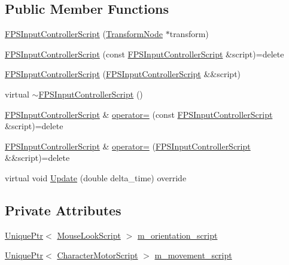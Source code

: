 \subsection*{Public Member Functions}
\begin{DoxyCompactItemize}
\item 
\hyperlink{classmage_1_1_f_p_s_input_controller_script_afb654c7011472ef300658503efaf1767}{F\+P\+S\+Input\+Controller\+Script} (\hyperlink{classmage_1_1_transform_node}{Transform\+Node} $\ast$transform)
\item 
\hyperlink{classmage_1_1_f_p_s_input_controller_script_ad47bd24645ec8a7b08c3048c92ed56fd}{F\+P\+S\+Input\+Controller\+Script} (const \hyperlink{classmage_1_1_f_p_s_input_controller_script}{F\+P\+S\+Input\+Controller\+Script} \&script)=delete
\item 
\hyperlink{classmage_1_1_f_p_s_input_controller_script_ad6919f0f67c16499ac467d400f96a4b5}{F\+P\+S\+Input\+Controller\+Script} (\hyperlink{classmage_1_1_f_p_s_input_controller_script}{F\+P\+S\+Input\+Controller\+Script} \&\&script)
\item 
virtual \hyperlink{classmage_1_1_f_p_s_input_controller_script_aab7082be73c735e0977e9efbbca72d98}{$\sim$\+F\+P\+S\+Input\+Controller\+Script} ()
\item 
\hyperlink{classmage_1_1_f_p_s_input_controller_script}{F\+P\+S\+Input\+Controller\+Script} \& \hyperlink{classmage_1_1_f_p_s_input_controller_script_a226a1fb2eecbd7ecdf2033a8f5460e8b}{operator=} (const \hyperlink{classmage_1_1_f_p_s_input_controller_script}{F\+P\+S\+Input\+Controller\+Script} \&script)=delete
\item 
\hyperlink{classmage_1_1_f_p_s_input_controller_script}{F\+P\+S\+Input\+Controller\+Script} \& \hyperlink{classmage_1_1_f_p_s_input_controller_script_adac34abea3d474bf8183c2555dde9034}{operator=} (\hyperlink{classmage_1_1_f_p_s_input_controller_script}{F\+P\+S\+Input\+Controller\+Script} \&\&script)=delete
\item 
virtual void \hyperlink{classmage_1_1_f_p_s_input_controller_script_ab78955a67341970a41b21ae943b81585}{Update} (double delta\+\_\+time) override
\end{DoxyCompactItemize}
\subsection*{Private Attributes}
\begin{DoxyCompactItemize}
\item 
\hyperlink{namespacemage_a8c307fbcc33bce9b7f2aa4c26c3b95cf}{Unique\+Ptr}$<$ \hyperlink{classmage_1_1_mouse_look_script}{Mouse\+Look\+Script} $>$ \hyperlink{classmage_1_1_f_p_s_input_controller_script_a22d47829d2bf8ef73d20e531b3be4165}{m\+\_\+orientation\+\_\+script}
\item 
\hyperlink{namespacemage_a8c307fbcc33bce9b7f2aa4c26c3b95cf}{Unique\+Ptr}$<$ \hyperlink{classmage_1_1_character_motor_script}{Character\+Motor\+Script} $>$ \hyperlink{classmage_1_1_f_p_s_input_controller_script_adef81e743004c4c182ceb71f9bc35ab6}{m\+\_\+movement\+\_\+script}
\end{DoxyCompactItemize}
